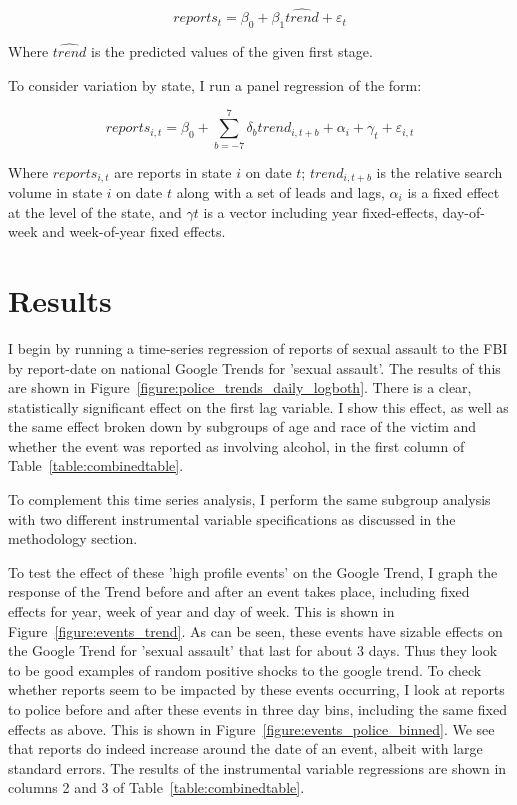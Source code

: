 \documentclass[AER,draftmode]{AEA}
\begin{document}
$$ 
reports_{t} = \beta_{0} + \beta_1 \hat{trend} + \varepsilon_{t}
$$

Where $\hat{trend}$ is the predicted values of the given first stage. 

To consider variation by state, I run a panel regression of the form:

$$ 
reports_{i,t} = \beta_{0} + \sum_{b=-7}^{7} \delta_{b} trend_{i,t+b} + \alpha_{i} + \gamma_{t} + \varepsilon_{i,t}
$$

Where $reports_{i,t}$ are reports in state $i$ on date $t$; $trend_{i,t+b}$ is the relative search volume in state $i$ on date $t$ along with a set of leads and lags, $\alpha_{i}$ is a fixed effect at the level of the state, and $\gamma{t}$ is a vector including year fixed-effects, day-of-week and week-of-year fixed effects. 

\section{Results}

I begin by running a time-series regression of reports of sexual assault to the FBI by report-date on national Google Trends for 'sexual assault'. The results of this are shown in Figure~\ref{figure:police_trends_daily_logboth}. There is a clear, statistically significant effect on the first lag variable. I show this effect, as well as the same effect broken down by subgroups of age and race of the victim and whether the event was reported as involving alcohol, in the first column of Table~\ref{table:combinedtable}. 

To complement this time series analysis, I perform the same subgroup analysis with two different instrumental variable specifications as discussed in the methodology section. 

To test the effect of these 'high profile events' on the Google Trend, I graph the response of the Trend before and after an event takes place, including fixed effects for year, week of year and day of week. This is shown in Figure~\ref{figure:events_trend}. As can be seen, these events have sizable effects on the Google Trend for 'sexual assault' that last for about 3 days. Thus they look to be good examples of random positive shocks to the google trend. To check whether reports seem to be impacted by these events occurring, I look at reports to police before and after these events in three day bins, including the same fixed effects as above. This is shown in Figure~\ref{figure:events_police_binned}. We see that reports do indeed increase around the date of an event, albeit with large standard errors.  The results of the instrumental variable regressions are shown in columns 2 and 3 of Table~\ref{table:combinedtable}. 
\end{document}
